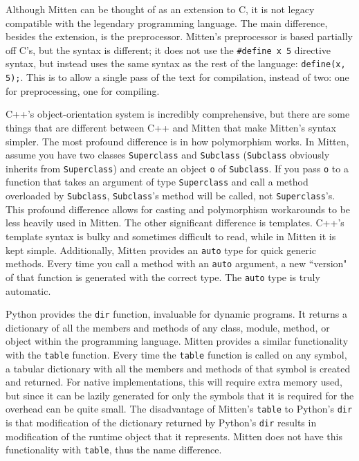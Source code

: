 \documentclass[10pt,a4paper]{article}
\begin{document}
Although Mitten can be thought of as an extension to C, it is not legacy compatible with the legendary programming language. The main difference, besides the extension, is the preprocessor. Mitten's preprocessor is based partially off C's, but the syntax is different; it does not use the \verb|#define x 5| directive syntax, but instead uses the same syntax as the rest of the language: \verb|define(x, 5);|. This is to allow a single pass of the text for compilation, instead of two: one for preprocessing, one for compiling.

C++'s object-orientation system is incredibly comprehensive, but there are some things that are different between C++ and Mitten that make Mitten's syntax simpler. The most profound difference is in how polymorphism works. In Mitten, assume you have two classes \verb|Superclass| and \verb|Subclass| (\verb|Subclass| obviously inherits from \verb|Superclass|) and create an object \verb|o| of \verb|Subclass|. If you pass \verb|o| to a function that takes an argument of type \verb|Superclass| and call a method overloaded by \verb|Subclass|, \verb|Subclass|'s method will be called, not \verb|Superclass|'s. This profound difference allows for casting and polymorphism workarounds to be less heavily used in Mitten. The other significant difference is templates. C++'s template syntax is bulky and sometimes difficult to read, while in Mitten it is kept simple. Additionally, Mitten provides an \verb|auto| type for quick generic methods. Every time you call a method with an \verb|auto| argument, a new ``version" of that function is generated with the correct type. The \verb|auto| type is truly automatic.

Python provides the \verb|dir| function, invaluable for dynamic programs. It returns a dictionary of all the members and methods of any class, module, method, or object within the programming language. Mitten provides a similar functionality with the \verb|table| function. Every time the \verb|table| function is called on any symbol, a tabular dictionary with all the members and methods of that symbol is created and returned. For native implementations, this will require extra memory used, but since it can be lazily generated for only the symbols that it is required for the overhead can be quite small. The disadvantage of Mitten's \verb|table| to Python's \verb|dir| is that modification of the dictionary returned by Python's \verb|dir| results in modification of the runtime object that it represents. Mitten does not have this functionality with \verb|table|, thus the name difference.
\end{document}
